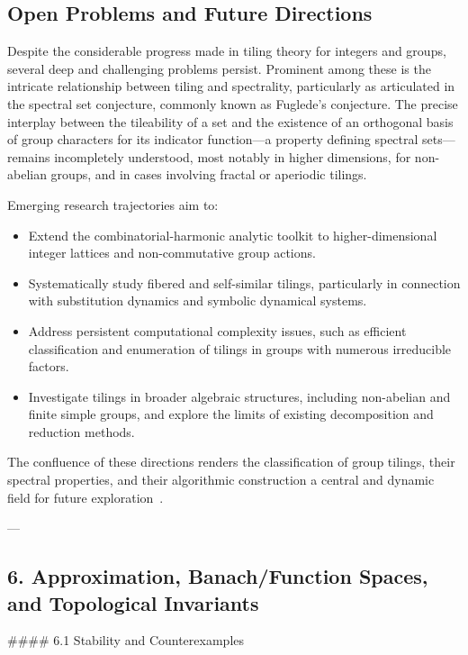\documentclass[11pt]{article}
\begin{document}
\subsection{Open Problems and Future Directions}

Despite the considerable progress made in tiling theory for integers and groups, several deep and challenging problems persist. Prominent among these is the intricate relationship between tiling and spectrality, particularly as articulated in the spectral set conjecture, commonly known as Fuglede’s conjecture. The precise interplay between the tileability of a set and the existence of an orthogonal basis of group characters for its indicator function—a property defining spectral sets—remains incompletely understood, most notably in higher dimensions, for non-abelian groups, and in cases involving fractal or aperiodic tilings.

Emerging research trajectories aim to:

\begin{itemize}
    \item Extend the combinatorial-harmonic analytic toolkit to higher-dimensional integer lattices and non-commutative group actions.
    \item Systematically study fibered and self-similar tilings, particularly in connection with substitution dynamics and symbolic dynamical systems.
    \item Address persistent computational complexity issues, such as efficient classification and enumeration of tilings in groups with numerous irreducible factors.
    \item Investigate tilings in broader algebraic structures, including non-abelian and finite simple groups, and explore the limits of existing decomposition and reduction methods.
\end{itemize}

The confluence of these directions renders the classification of group tilings, their spectral properties, and their algorithmic construction a central and dynamic field for future exploration~\cite{ref101}.

---

\subsection{6. Approximation, Banach/Function Spaces, and Topological Invariants}

#### 6.1 Stability and Counterexamples
\end{document}
